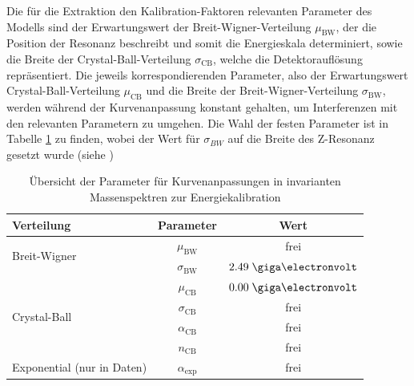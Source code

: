 Die für die Extraktion den Kalibration-Faktoren relevanten Parameter des
Modells sind der Erwartungswert der Breit-Wigner-Verteilung $\mu_\text{BW}$,
der die Position der Resonanz beschreibt und somit die Energieskala
determiniert, sowie die Breite der Crystal-Ball-Verteilung $\sigma_\text{CB}$,
welche die Detektorauflösung repräsentiert. Die jeweils korrespondierenden
Parameter, also der Erwartungswert Crystal-Ball-Verteilung $\mu_\text{CB}$ und
die Breite der Breit-Wigner-Verteilung $\sigma_\text{BW}$, werden während der
Kurvenanpassung konstant gehalten, um Interferenzen mit den relevanten
Parametern zu umgehen. Die Wahl der festen Parameter ist in Tabelle
\ref{tab:fit_parameters} zu finden, wobei der Wert für $\sigma_{BW}$ auf die
Breite des Z-Resonanz gesetzt wurde (siehe \cite{PhysRevD.86.010001})

\begin{table}[h]
    \centering
    \begin{tabular}{|l|c|c|}
        \hline
        \textbf{Verteilung} & \textbf{Parameter} & \textbf{Wert} \\
        \hline \hline
        \multirow{2}{*}{Breit-Wigner} & $\mu_\text{BW}$      & frei       \\
                                      & $\sigma_\text{BW}$   & $2.49\GeV$ \\
        \hline
        \multirow{4}{*}{Crystal-Ball} & $\mu_\text{CB}$      & $0.00\GeV$ \\
                                      & $\sigma_\text{CB}$   & frei       \\
                                      & $\alpha_\text{CB}$   & frei       \\
                                      & $n_\text{CB}$        & frei       \\
        \hline
        Exponential (nur in Daten)    & $\alpha_\text{exp}$  & frei       \\
        \hline
    \end{tabular}
    \caption{Übersicht der Parameter für Kurvenanpassungen in invarianten
        Massenspektren zur Energiekalibration}
    \label{tab:fit_parameters}
\end{table}

